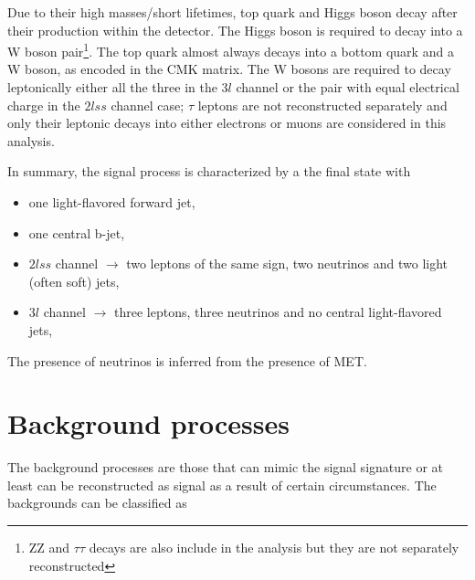 Due to their high masses/short lifetimes, top quark and Higgs boson decay after their production within the detector. The Higgs boson is required to decay into a W boson pair\footnote{ZZ and $\tau\tau$ decays are also include in the analysis but they are not separately reconstructed}. The top quark almost always decays into a bottom quark and a W boson, as encoded in the CMK matrix. The W bosons are required to decay leptonically either all the three in the $3l$ channel or the pair with equal electrical charge in the $2lss$ channel case; $\tau$ leptons are not reconstructed separately and only their leptonic decays into either electrons or muons are considered in this analysis.

In summary, the signal process is characterized by a the final state with

\begin{itemize}
\item one light-flavored forward jet,
\item one central b-jet,
\item $2lss$ channel $\to$ two leptons of the same sign, two neutrinos and two light (often soft) jets,
\item $3l$ channel $\to$ three leptons, three neutrinos and no central light-flavored jets,
\end{itemize}

The presence of neutrinos is inferred from the presence of MET.


\section{Background processes}\label{sec:bg}

The background processes are those that can mimic the signal signature or at least can be reconstructed as signal as a result of certain circumstances. The backgrounds can be classified as

